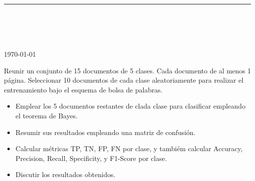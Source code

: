 



\thispagestyle{empty}

\begin{center}
\textsc{\theinstitution}\\[2mm]

\thedepartment

\rule{0.6\textwidth}{0.5pt}\\[2mm]

\thecourse \\[4mm]

{\Large \textbf{\thetitle}}\\[2mm]

\theauthor \\[2mm]

{\small \today}
\end{center}
\medskip

\vspace{1cm}

Reunir un conjunto de 15 documentos de 5 clases. Cada documento de al menos 1 página. Seleccionar 10 documentos de cada clase aleatoriamente para realizar el entrenamiento bajo el esquema de bolsa de palabras.
\begin{itemize}
    \item Emplear los 5 documentos restantes de clada clase para clasificar empleando el teorema de Bayes.
    \item Resumir sus resultados empleando una matriz de confusión.
    \item Calcular métricas TP, TN, FP, FN por clase, y tambiém calcular Accuracy, Precision, Recall, Specificity, y F1-Score por clase.
    \item Discutir los resultados obtenidos.
\end{itemize}

